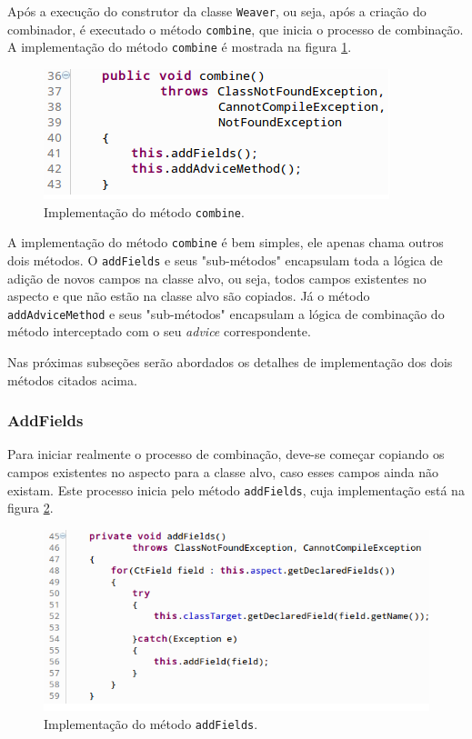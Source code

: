 \documentclass[tc,oneside]{iiufrgs}
\begin{document}
Após a execução do construtor da classe \texttt{Weaver}, ou seja, após a criação do combinador, é executado o método \texttt{combine}, que inicia o processo de combinação. A implementação do método \texttt{combine} é mostrada na figura \ref{fig:combine}.

\begin{figure}[ht]
	\centering
	\includegraphics[scale=0.6]{figuras/implementacao/combine.png}
	\caption{Implementação do método \texttt{combine}.}
	\label{fig:combine}
\end{figure}

A implementação do método \texttt{combine} é bem simples, ele apenas chama outros dois métodos. O \texttt{addFields} e seus "sub-métodos" encapsulam toda a lógica de adição de novos campos na classe alvo, ou seja, todos campos existentes no aspecto e que não estão na classe alvo são copiados. Já o método \texttt{addAdviceMethod} e seus "sub-métodos" encapsulam a lógica de combinação do método interceptado com o seu \textit{advice} correspondente. 

Nas próximas subseções serão abordados os detalhes de implementação dos dois métodos citados acima.

\subsubsection{AddFields}

Para iniciar realmente o processo de combinação, deve-se começar copiando os campos existentes no aspecto para a classe alvo, caso esses campos ainda não existam. Este processo inicia pelo método \texttt{addFields}, cuja implementação está na figura \ref{fig:addfields}.

\begin{figure}[ht]
	\centering
	\includegraphics[scale=0.6]{figuras/implementacao/addfields.png}
	\caption{Implementação do método \texttt{addFields}.}
	\label{fig:addfields}
\end{figure}
\end{document}

